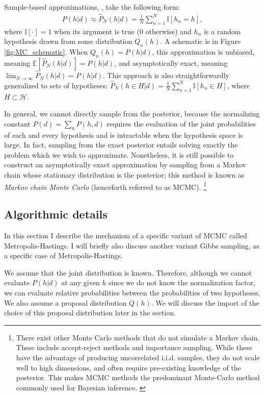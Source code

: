 Sample-based approximations, \citep[also known as \emph{Monte Carlo} approximations][]{robert13}, take the following form:
\begin{align}
P(h|d) \approx \hat{P}_N(h|d) = \frac{1}{N}\sum_{n=1}^N \mathbb{I}[h_n=h],
\end{align}
where $\mathbb{I}[\cdot]=1$ when its argument is true (0 otherwise) and $h_n$ is a random hypothesis drawn from some distribution $Q_n(h)$. A schematic is in Figure \ref{fig:MC_schematic}. When $Q_n(h) = P(h|d)$, this approximation is unbiased, meaning $\mathbb{E}[\hat{P}_N(h|d)] = P(h|d)$, and asymptotically exact, meaning $\lim_{N\rightarrow \infty} \hat{P}_N(h|d) = P(h|d)$. This approach is also straightforwardly generalized to sets of hypotheses: $\hat{P}_N(h \in H|d) = \frac{1}{N}\sum_{n=1}^N \mathbb{I}[h_n \in H]$, where $H \subset \mathcal{H}$. 

In general, we cannot directly sample from the posterior, because the normalizing constant $P(d) = \sum_{h} P(h,d)$ requires the evaluation of the joint probabilities of each and every hypothesis and is intractable when the hypothesis space is large. In fact, sampling from the exact posterior entails solving exactly the problem which we wish to approximate. Nonetheless, it is still possible to construct an asymptotically exact approximation by sampling from a Markov chain whose stationary distribution is the posterior; this method is known as \emph{Markov chain Monte Carlo} (henceforth referred to as MCMC). \footnote{There exist other Monte Carlo methods that do not simulate a Markov chain. These include accept-reject methods and importance sampling. While these have the advantage of producing uncorrelated i.i.d. samples, they do not scale well to high dimensions, and often require pre-existing knowledge of the posterior. This makes MCMC methods the predominant Monte-Carlo method commonly used for Bayesian inference. \cite{neal1993probabilistic, andrieu2003introduction}}

\subsection{Algorithmic details}

In this section I describe the mechanism of a specific variant of MCMC called Metropolis-Hastings. I will briefly also discuss another variant Gibbs sampling, as a specific case of Metropolis-Hastings.

We assume that the joint distribution is known. Therefore, although we cannot evaluate $P(h | d)$ at any given $h$ since we do not know the normalization factor, we can evaluate relative probabilities between the probabilities of two hypotheses. We also assume a proposal distribution $Q(h)$. We will discuss the import of the choice of this proposal distribution later in the section. 

